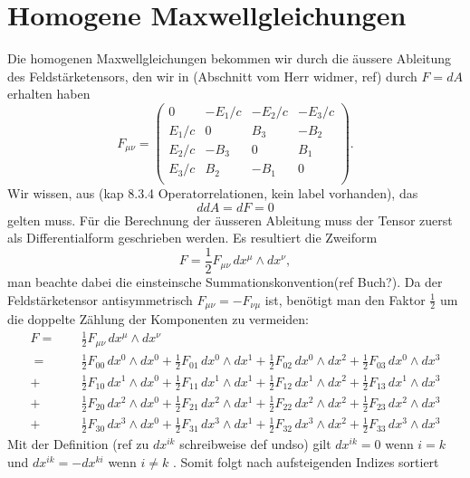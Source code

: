\section{Homogene Maxwellgleichungen}
Die homogenen Maxwellgleichungen bekommen wir durch die äussere Ableitung des Feldstärketensors, den wir in (Abschnitt vom Herr widmer, ref) durch $F = dA$ erhalten haben
\[
F_{\mu\nu}
= 
\begin{pmatrix}
	0 & -E_1/c & -E_2/c & -E_3/c \\
	E_1/c &  0 &  B_3 & -B_2 \\
	E_2/c & -B_3 &  0 &  B_1 \\
	E_3/c &  B_2 & -B_1 &  0 \\
\end{pmatrix}.
\]
Wir wissen, aus (kap 8.3.4 Operatorrelationen, kein label vorhanden), das
\[
ddA = dF = 0
\]
gelten muss.
Für die Berechnung der äusseren Ableitung muss der Tensor zuerst als Differentialform geschrieben werden.
Es resultiert die Zweiform
\[
F
= \frac{1}{2} F_{\mu\nu} \, dx^\mu \wedge dx^\nu,
\]
man beachte dabei die einsteinsche Summationskonvention(ref Buch?).
Da der Feldstärketensor antisymmetrisch $F_{\mu\nu} = -F_{\nu\mu}$ ist, benötigt man den Faktor $\frac{1}{2}$ um die doppelte Zählung der Komponenten zu vermeiden:
\begin{align*}
	F
	= 
	\phantom{+} &\frac{1}{2} F_{\mu\nu} \, dx^\mu \wedge dx^\nu
	\\
	=
	\phantom{+} &\frac{1}{2} F_{00} \, dx^0 \wedge dx^0 + \frac{1}{2} F_{01} \, dx^0 \wedge dx^1 + \frac{1}{2} F_{02} \, dx^0 \wedge dx^2 + \frac{1}{2} F_{03} \, dx^0 \wedge dx^3
	\\
	+ &\frac{1}{2} F_{10} \, dx^1 \wedge dx^0 + \frac{1}{2} F_{11} \, dx^1 \wedge dx^1 + \frac{1}{2} F_{12} \, dx^1 \wedge dx^2 + \frac{1}{2} F_{13} \, dx^1 \wedge dx^3
	\\
	+ &\frac{1}{2} F_{20} \, dx^2 \wedge dx^0 + \frac{1}{2} F_{21} \, dx^2 \wedge dx^1 + \frac{1}{2} F_{22} \, dx^2 \wedge dx^2 + \frac{1}{2} F_{23} \, dx^2 \wedge dx^3
	\\
	+ &\frac{1}{2} F_{30} \, dx^3 \wedge dx^0 + \frac{1}{2} F_{31} \, dx^3 \wedge dx^1 + \frac{1}{2} F_{32} \, dx^3 \wedge dx^2 + \frac{1}{2} F_{33} \, dx^3 \wedge dx^3
\end{align*} 
Mit der Definition (ref zu $dx^{ik}$ schreibweise def undso) gilt $dx^{ik} = 0$ wenn $i=k$ und $dx^{ik} = -dx^{ki}$ wenn $i \neq k $ . Somit folgt nach aufsteigenden Indizes sortiert

